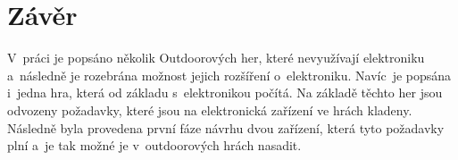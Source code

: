 \chapter*{Závěr}
{}

V~práci je popsáno několik Outdoorových her, které nevyužívají elektroniku a~následně je rozebrána možnost jejich rozšíření o~elektroniku.
Navíc~je popsána i~jedna hra, která od základu s~elektronikou počítá.
Na základě těchto her jsou odvozeny požadavky, které jsou na elektronická zařízení ve hrách kladeny.
Následně byla provedena první fáze návrhu dvou zařízení, která tyto požadavky plní a~je tak možné je v~outdoorových hrách nasadit.